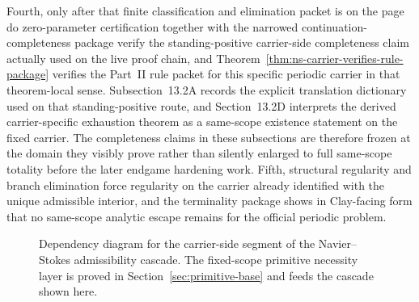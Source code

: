 Fourth, only after that finite classification and elimination packet is on the page do zero-parameter certification together with the narrowed continuation-completeness package verify the standing-positive carrier-side completeness claim actually used on the live proof chain, and Theorem~\ref{thm:ns-carrier-verifies-rule-package} verifies the Part~II rule packet for this specific periodic carrier in that theorem-local sense. Subsection~13.2A records the explicit translation dictionary used on that standing-positive route, and Section~13.2D interprets the derived carrier-specific exhaustion theorem as a same-scope existence statement on the fixed carrier. The completeness claims in these subsections are therefore frozen at the domain they visibly prove rather than silently enlarged to full same-scope totality before the later endgame hardening work.
Fifth, structural regularity and branch elimination force regularity on the carrier already identified with the unique admissible interior, and the terminality package shows in Clay-facing form that no same-scope analytic escape remains for the official periodic problem.

\begin{figure}[p]
\centering
{}
\caption{Dependency diagram for the carrier-side segment of the Navier--Stokes admissibility cascade. The fixed-scope primitive necessity layer is proved in Section~\ref{sec:primitive-base} and feeds the cascade shown here.}
\end{figure}

